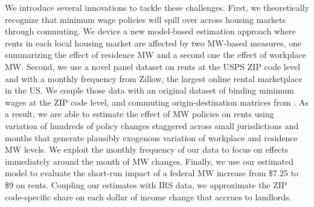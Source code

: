 We introduce several innovations to tackle these challenges.
First, we theoretically recognize that minimum wage policies will spill over across
housing markets through commuting.
We device a new model-based estimation approach where rents in each local housing 
market are affected by two MW-based measures, one summarizing the effect of 
residence MW and a second one the effect of workplace MW.
Second, we use a novel panel dataset on rents at the USPS ZIP code level and with 
a monthly frequency from Zillow, the largest online rental marketplace in the US.
We couple those data with an original dataset of binding minimum wages at the
ZIP code level, and commuting origin-destination matrices from \textcite{LODES}.
As a result, we are able to estimate the effect of MW policies on rents using 
variation of hundreds of policy changes staggered across small jurisdictions and 
months that generate plausibly exogenous variation of workplace and residence MW
levels.
We exploit the monthly frequency of our data to focus on effects immediately
around the month of MW changes.
Finally, we use our estimated model to evaluate the short-run impact of a federal 
MW increase from \$7.25 to \$9 on rents.
Coupling our estimates with IRS data, we approximate the ZIP code-specific share on 
each dollar of income change that accrues to landlords.


